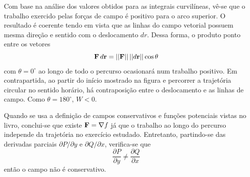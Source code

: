 \documentclass[a4paper, 12pt, brazilian]{article}
\begin{document}
	Com base na análise dos valores obtidos para as integrais curvilíneas, vê-se que o trabalho exercido pelas forças de campo é positivo para o arco superior. O resultado é coerente tendo em vista que as linhas do campo vetorial possuem mesma direção e sentido com o deslocamento $dr$. Dessa forma, o produto ponto entre os vetores	
	\begin{equation}
		\textbf{F}\,d\textbf{r}=||\textbf{F}||\,||d\textbf{r}||\cos\theta
	\end{equation}
	com $\theta=0^{\circ}$ ao longo de todo o percurso ocasionará num trabalho positivo. Em contrapartida, ao partir do início mostrado na figura e percorrer a trajetória circular no sentido horário, há contraposição entre o deslocamento e as linhas de campo. Como $\theta=180^{\circ}$, $W<0$.
	
	Quando se usa a definição de campos conservativos e funções potenciais vistas no livro, conclui-se que existe $\textbf{F}=\nabla f$ já que o trabalho ao longo do percurso independe da trajetória no exercício estudado. Entretanto, partindo-se das derivadas parciais $\partial P/\partial y$ e $\partial Q/\partial x$, verifica-se que
	\begin{equation}
		\dfrac{\partial P}{\partial y}\neq\dfrac{\partial Q}{\partial x}
	\end{equation} 
	então o campo não é conservativo.
	
	
	
\end{document}
